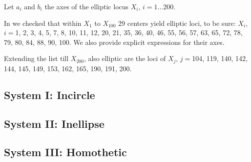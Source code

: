 Let $a_i$ and $b_i$ the axes of the elliptic locus $X_i$, $i=1{\ldots}200$.

In \cite{garcia2020-ellipses} we checked that within $X_1$ to $X_{100}$ 29 centers yield elliptic loci, to be sure: $X_i$, $i=$1, 2, 3, 4, 5, 7, 8, 10, 11, 12, 20, 21, 35, 36, 40, 46, 55, 56, 57, 63, 65, 72, 78, 79, 80, 84, 88, 90, 100. We also provide explicit expressions for their axes.

Extending the list till $X_{200}$, also elliptic are the loci of $X_j$, $j=$104, 119, 140, 142, 144, 145, 149, 153, 162, 165, 190, 191, 200.

\subsection{System I: Incircle}


\subsection{System II: Inellipse}


\subsection{System III: Homothetic}
\label{app:ell-axes-III}


